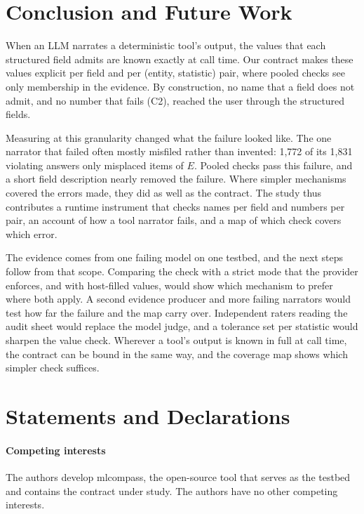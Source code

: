 \documentclass[journal]{IEEEtran}
\begin{document}
\section{Conclusion and Future Work}\label{sec:conclusion}

When an LLM narrates a deterministic tool's output, the values that each
structured field admits are known exactly at call time. Our contract makes these
values explicit per field and per (entity, statistic) pair, where pooled checks
see only membership in the evidence. By construction, no name that a field does
not admit, and no number that fails (C2), reached the user through the
structured fields.

Measuring at this granularity changed what the failure looked like. The one
narrator that failed often mostly misfiled rather than invented: 1{,}772 of its
1{,}831 violating answers only misplaced items of $E$. Pooled checks pass this
failure, and a short field description nearly removed the failure. Where simpler
mechanisms covered the errors made, they did as well as the contract. The study
thus contributes a runtime instrument that checks names per field and numbers per
pair, an account of how a tool narrator fails, and a map of which check covers
which error.

The evidence comes from one failing model on one testbed, and the next steps
follow from that scope. Comparing the check with a strict mode that the provider
enforces, and with host-filled values, would show which mechanism to prefer
where both apply. A second evidence producer and more failing narrators would
test how far the failure and the map carry over. Independent raters reading the
audit sheet would replace the model judge, and a tolerance set per statistic
would sharpen the value check. Wherever a tool's output is known in full at call
time, the contract can be bound in the same way, and the coverage map shows which
simpler check suffices.

\section*{Statements and Declarations}
\paragraph{Competing interests}
The authors develop mlcompass, the open-source tool that serves as the testbed
and contains the contract under study. The authors have no other competing
interests.
\end{document}
